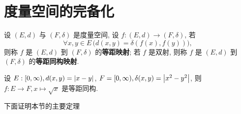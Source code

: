 \section{度量空间的完备化}
\begin{Definition}[等距同构]\label{def:等距同构}
	设 $ (E, d) $ 与 $ (F, \delta) $ 是度量空间, 设 $ f:(E, d)\to(F, \delta) $, 若
	\[
		\forall x, y\in E\,\big(d(x, y)=\delta(f(x), f(y))\big),
	\]
	则称 $ f $ 是 $ (E, d) $ 到 $ (F, \delta) $ 的\textbf{等距映射}; 若 $ f $ 是双射, 则称 $ f $ 是 $ (E, d) $ 到 $ (F, \delta) $ 的\textbf{等距同构映射}.
\end{Definition}

\begin{Example}
	设 $ E:[0,\infty), d(x, y)=\left| x-y \right|  $, $ F=[0, \infty), \delta(x, y)=\left| x^{2}-y^{2} \right|  $, 则 $ f:E\to F, x\mapsto \sqrt{x} $ 是等距同构.
\end{Example}

下面证明本节的主要定理

